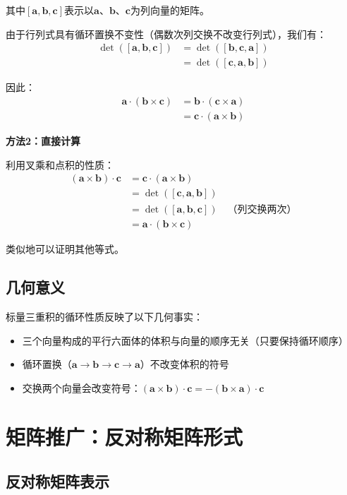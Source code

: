 \documentclass[12pt,a4paper]{article}
\begin{document}
其中$[\bm{a}, \bm{b}, \bm{c}]$表示以$\bm{a}$、$\bm{b}$、$\bm{c}$为列向量的矩阵。

由于行列式具有循环置换不变性（偶数次列交换不改变行列式），我们有：
\begin{align}
\det([\bm{a}, \bm{b}, \bm{c}]) &= \det([\bm{b}, \bm{c}, \bm{a}]) \\
&= \det([\bm{c}, \bm{a}, \bm{b}])
\end{align}

因此：
\begin{align}
\bm{a} \cdot (\bm{b} \times \bm{c}) &= \bm{b} \cdot (\bm{c} \times \bm{a}) \\
&= \bm{c} \cdot (\bm{a} \times \bm{b})
\end{align}

\textbf{方法2：直接计算}

利用叉乘和点积的性质：
\begin{align}
(\bm{a} \times \bm{b}) \cdot \bm{c} &= \bm{c} \cdot (\bm{a} \times \bm{b}) \\
&= \det([\bm{c}, \bm{a}, \bm{b}]) \\
&= \det([\bm{a}, \bm{b}, \bm{c}]) \quad \text{（列交换两次）} \\
&= \bm{a} \cdot (\bm{b} \times \bm{c})
\end{align}

类似地可以证明其他等式。

\subsection{几何意义}

标量三重积的循环性质反映了以下几何事实：
\begin{itemize}
\item 三个向量构成的平行六面体的体积与向量的顺序无关（只要保持循环顺序）
\item 循环置换（$\bm{a} \to \bm{b} \to \bm{c} \to \bm{a}$）不改变体积的符号
\item 交换两个向量会改变符号：$(\bm{a} \times \bm{b}) \cdot \bm{c} = -(\bm{b} \times \bm{a}) \cdot \bm{c}$
\end{itemize}

\section{矩阵推广：反对称矩阵形式}

\subsection{反对称矩阵表示}
\end{document}
